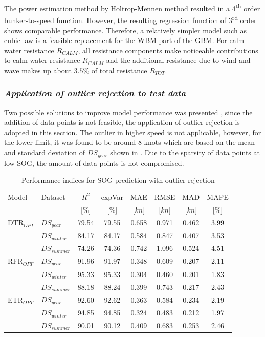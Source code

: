 The power estimation method by Holtrop-Mennen method resulted in a 4\textsuperscript{th} order bunker-to-speed function. However, the resulting regression function of 3\textsuperscript{rd} order shows comparable performance. Therefore, a relatively simpler model such as cubic law is a feasible replacement for the WBM part of the GBM. For calm water resistance $R_{CALM}$, all resistance components make noticeable contributions to calm water resistance $R_{CALM}$ and the additional resistance due to wind and wave makes up about $3.5\%$ of total resistance $R_{TOT}$.\\

\subsubsection*{\emph{Application of outlier rejection to test data}}

Two possible solutions to improve model performance was presented , since the addition of data points is not feasible, the application of outlier rejection is adopted in this section. The outlier in higher speed is not applicable, however, for the lower limit, it was found to be around 8 knots which are based on the mean and standard deviation of $DS_{year}$ shown in . Due to the sparsity of data points at low SOG, the amount of data points is not compromised.\\
\begin{table}[h!]
    \small
    \centering
    {\begin{tabular}{ l l c c c c c c }
    \hline
    Model & Dataset & $R^2$ & expVar & MAE & RMSE & MAD & MAPE \\
    & & [$\%$] & [$\%$] & [$kn$] & [$kn$] & [$kn$] & [$\%$]  \\ 
    \hline
    $\text{DTR}_{OPT}$ & $DS_{year}$ & 79.54 & 79.55 & 0.658 & 0.971 & 0.462 & 3.99 \\
    & $DS_{winter}$ & 84.17 & 84.17 & 0.584 & 0.847 & 0.407 & 3.53 \\
    & $DS_{summer}$ & 74.26 & 74.36 & 0.742  & 1.096 & 0.524 & 4.51 \\
    $\text{RFR}_{OPT}$ & $DS_{year}$  & 91.96 & 91.97 & 0.348 & 0.609 & 0.207  & 2.11 \\
    & $DS_{winter}$ & 95.33 & 95.33 & 0.304 & 0.460 & 0.201 & 1.83 \\
    & $DS_{summer}$ & 88.18 & 88.24 & 0.399 & 0.743 & 0.217 & 2.43 \\
    $\text{ETR}_{OPT}$ & $DS_{year}$ & 92.60 & 92.62 & 0.363 & 0.584 & 0.234  & 2.19 \\
    & $DS_{winter}$ & 94.85 & 94.85 &  0.324  & 0.483 & 0.212 & 1.97 \\
    & $DS_{summer}$ & 90.01 & 90.12 & 0.409 & 0.683 & 0.253  & 2.46 \\
    \hline
    \end{tabular}}
\caption{Performance indices for SOG prediction with outlier rejection}\label{tbl:sog_scores_errors_rejection}
\end{table}

